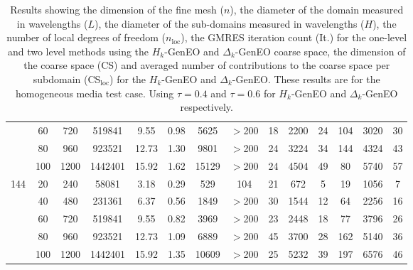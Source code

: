 \documentclass[preprint,3p,times]{elsarticle}
\theoremstyle{definition}
\numberwithin{equation}{section}
\begin{document}
\begin{table}[H]
\begin{tabular}{ccccccc|c|ccc|ccc}
 & 60 & 720 & 519841 &  9.55 & 0.98 & 5625 & $>$200 & 18 & 2200 & 24 & 104 & 3020 & 30 \\
 & 80 & 960 & 923521 &  12.73 & 1.30 & 9801 & $>$200 & 24 & 3224 & 34 & 144 & 4324 & 43 \\
 & 100 & 1200 & 1442401 &  15.92 & 1.62 & 15129 & $>$200 & 24 & 4504 & 49 & 80 & 5740 & 57 \\
\hline
144 & 20 & 240 & 58081 & 3.18 & 0.29 & 529 & 104 & 21 & 672 & 5 & 19 & 1056 & 7 \\
 & 40 & 480 & 231361 &  6.37 & 0.56 & 1849 & $>$200 & 30 & 1544 & 12 & 64 & 2256 & 16 \\
 & 60 & 720 & 519841 &  9.55 & 0.82 & 3969 & $>$200 & 23 & 2448 & 18 & 77 & 3796 & 26 \\
 & 80 & 960 & 923521 &  12.73 & 1.09 & 6889 & $>$200 & 45 & 3700 & 28 & 162 & 5140 & 36 \\
 & 100 & 1200 & 1442401 &  15.92 & 1.35 & 10609 & $>$200 & 25 & 5232 & 39 & 197 & 6576 & 46 \\
\hline
\end{tabular}
    \caption{Results showing the dimension of the fine mesh ($n$), the diameter of the domain measured in wavelengths ($L$), the diameter of the sub-domains measured in wavelengths ($H$), the number of local degrees of freedom ($n_\text{loc}$), the GMRES iteration count (It.) for the one-level and two level methods using the $H_k$-GenEO and $\Delta_k$-GenEO coarse space, the dimension of the coarse space (CS) and averaged number of contributions to the coarse space per subdomain (CS$_\text{loc}$) for the $H_k$-GenEO and $\Delta_k$-GenEO. These results are for the homogeneous media test case. Using $\tau = 0.4$ and $\tau=0.6$ for $H_k$-GenEO and $\Delta_k$-GenEO respectively.}
    \label{table:HkDeltaHomog}
\end{table}
\end{document}
